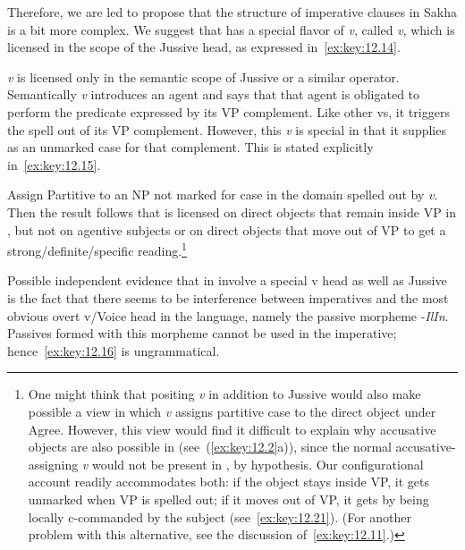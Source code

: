 \documentclass[output=paper]{langsci/langscibook}
\begin{document}
Therefore, we are led to propose that the structure of imperative clauses in
Sakha is a bit more complex. We suggest that  has a special flavor
of \emph{v}, called \emph{v}\textsubscript{\Imp}, which is licensed in the scope of
the Jussive head, as expressed in~\eqref{ex:key:12.14}.

\ea\label{ex:key:12.14}
\emph{v}\textsubscript{\Imp} is licensed only in the semantic scope of Jussive or a similar operator.
\z
Semantically \emph{v}\textsubscript{\Imp} introduces an agent and says that that agent
is obligated to perform the predicate expressed by its VP complement. Like
other vs, it triggers the spell out of its VP complement. However, this \emph{v} is
special in that it supplies  as an unmarked case for that
complement. This is stated explicitly in~\eqref{ex:key:12.15}.

\ea\label{ex:key:12.15}
Assign Partitive to an NP not marked for case in the domain spelled out by \emph{v}\textsubscript{\Imp}.
\z
Then the result follows that  is licensed on direct objects
that remain inside VP in , but not on agentive subjects or on direct
objects that move out of VP to get a strong/definite/specific
reading.\footnote{One might think that positing \emph{v}\textsubscript{\Imp} in
    addition to Jussive would also make possible a view in which
    \emph{v}\textsubscript{\Imp} assigns partitive case to the direct object
    under Agree.  However, this view would find it difficult to explain why
    accusative objects are also possible in 
    (see~(\ref{ex:key:12.2}a)), since the normal accusative-assigning \emph{v}
    would not be present in , by hypothesis. Our
    configurational account readily accommodates both: if the object stays
    inside VP, it gets unmarked  when VP is spelled out; if
    it moves out of VP, it gets  by being locally c-commanded by
    the subject (see~\eqref{ex:key:12.21}). (For another problem with this
alternative, see the discussion of~\eqref{ex:key:12.11}.)}

Possible independent evidence that  in  involve a special v
head as well as Jussive is the fact that there seems to be interference between
imperatives and the most obvious overt v/Voice head in the language, namely the
passive morpheme -\emph{IlIn}. Passives formed with this morpheme cannot be
used in the imperative; hence~\eqref{ex:key:12.16} is ungrammatical.\newpage
\end{document}
